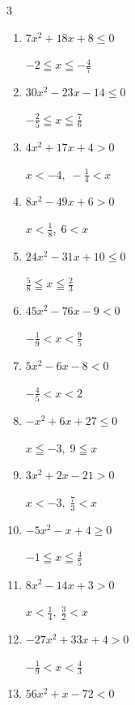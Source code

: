 \begin{multicols}{3}
\begin{enumerate}
  \item $7x^{2}+18x+8\leq 0$

        $\displaystyle -2 \leqq x \leqq -\frac{4}{7}$

  \item $30x^{2}-23x-14\leq 0$

        $\displaystyle -\frac{2}{5} \leqq x \leqq \frac{7}{6}$

  \item $4x^{2}+17x+4>0$

        $\displaystyle x < -4 , \; -\frac{1}{4} < x$

\columnbreak %

  \item $8x^{2}-49x+6>0$

        $\displaystyle x < \frac{1}{8} , \; 6 < x$

  \item $24x^{2}-31x+10\leq 0$

        $\displaystyle \frac{5}{8} \leqq x \leqq \frac{2}{3}$

  \item $45x^{2}-76x-9<0$

        $\displaystyle -\frac{1}{9} < x < \frac{9}{5}$

  \item $5x^{2}-6x-8<0$

        $\displaystyle -\frac{4}{5} < x < 2$

  \item $-x^{2}+6x+27\leq 0$

        $\displaystyle x \leqq -3 , \; 9 \leqq x$

  \item $3x^{2}+2x-21>0$

        $\displaystyle x < -3 , \; \frac{7}{3} < x$

  \item $-5x^{2}-x+4\geq 0$

        $\displaystyle -1 \leqq x \leqq \frac{4}{5}$

  \item $8x^{2}-14x+3>0$

        $\displaystyle x < \frac{1}{4} , \; \frac{3}{2} < x$

  \item $-27x^{2}+33x+4>0$

        $\displaystyle -\frac{1}{9} < x < \frac{4}{3}$

  \item $56x^{2}+x-72<0$


\end{enumerate}
\end{multicols}
